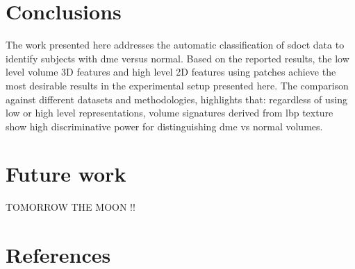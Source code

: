 \documentclass[review]{elsarticle}
\begin{document}
\maketitle

\acresetall  %


%

\section{Conclusions}\label{sec:con}
The work presented here addresses the automatic classification of \ac{sdoct} data to identify subjects with \ac{dme} versus normal.
Based on the reported results, the low level volume 3D features and high level 2D features using patches achieve the most desirable results in the experimental setup presented here.
The comparison against different datasets and methodologies, highlights that:
regardless of using low or high level representations, volume signatures derived from \ac{lbp} texture show high discriminative power for distinguishing \ac{dme} vs normal volumes.

\section{Future work }
TOMORROW THE MOON !!



\section*{References}
\end{document}
